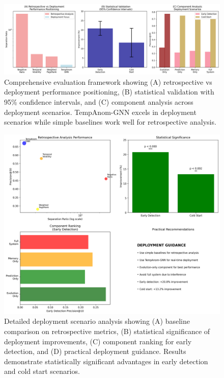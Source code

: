 
\begin{figure}[htbp]
\centering
\includegraphics[width=\textwidth]{figures/figure1_overview.png}
\caption{Comprehensive evaluation framework showing (A) retrospective vs deployment performance positioning, (B) statistical validation with 95\% confidence intervals, and (C) component analysis across deployment scenarios. TempAnom-GNN excels in deployment scenarios while simple baselines work well for retrospective analysis.}
\label{fig:overview}
\end{figure}

\begin{figure}[htbp]
\centering
\includegraphics[width=\textwidth]{figures/figure2_detailed.png}
\caption{Detailed deployment scenario analysis showing (A) baseline comparison on retrospective metrics, (B) statistical significance of deployment improvements, (C) component ranking for early detection, and (D) practical deployment guidance. Results demonstrate statistically significant advantages in early detection and cold start scenarios.}
\label{fig:detailed}
\end{figure}

